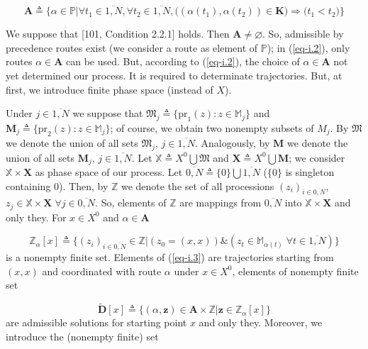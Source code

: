 \documentclass{article}
\begin{document}
\begin{equation*}
  \mathbf A \triangleq
  \big\{
  \alpha \in \mathbb P
  \big|
  \forall t_1 \in \overline{1,N},
  \forall t_2 \in \overline{1,N},
  \big(
    (\alpha(t_1), \alpha(t_2)) \in \mathbf K
  \big)
  \Rightarrow
  \big(t_1 < t_2 \big)
\big\}
\end{equation*}

We suppose that
[101, Condition 2.2.1]  %
holds.
Then
$\mathbf A \neq \varnothing$.
So,
admissible by precedence routes exist
(we consider a route as element of
$\mathbb P$);
in (\ref{eq-i.2}),
only routes
$\alpha \in \mathbf A$
can be used.
But, according to (\ref{eq-i.2}),
the choice of
$\alpha \in \mathbf A$
not yet determined our process.
It is required to determinate trajectories.
But, at first,
we introduce finite phase space
(instead of $X$).

Under
$j \in \overline{1, N}$
we suppose that
$
\mathfrak M_j \triangleq
\{\mathrm{pr}_1(z): z \in \mathbb M_j \}
$
and
$
\mathbf M_j \triangleq
\{ \mathrm{pr}_2(z): z \in \mathbb M_j \}
$;
of course,
we obtain two nonempty subsets of
$M_j$.
By
$\mathfrak M$
we denote the union of all sets
$\mathfrak M_j$,
$j \in \overline{1,N}$.
Analogously,
by
$\mathbf M$
we denote the union of all sets
$\mathbf M_j$,
$j \in \overline{1,N}$.
Let
$\mathbb X \triangleq
X^0 \bigcup \mathfrak M$
and
$
\mathbf X \triangleq
X^0 \bigcup \mathbf M
$;
we consider
$\mathbb X \times \mathbf X$
as phase space of our process.
Let
$\overline{0, N} \triangleq \{0\} \bigcup \overline{1,N}$
($\{0\}$ is singleton containing 0).
Then, by
$\mathbb Z$
we denote the set of all processions
$(z_i)_{i\in\overline{0,N}}$,
$z_j \in \mathbb X \times \mathbf X
\; \forall j \in \overline{0,N}$.
So, elements of
$\mathbb Z$
are mappings from
$\overline{0,N}$
into
$\mathbb X \times \mathbf X$
and only they.
For
$x \in X^0$
and
$\alpha \in \mathbf A$

\begin{equation}
  \label{eq-i.3}
  \mathbb Z_\alpha[x] \triangleq
  \big\{
    (z_i)_{i \in \overline{0,N}} \in \mathbb Z
  \big|
  (z_0 =(x,x))
  \&
  (z_t \in \mathbb M_{\alpha(t)}
  \;\forall t \in \overline{1,N})
  \big\}
\end{equation}
is a nonempty finite set.
Elements of (\ref{eq-i.3})
are trajectories starting from
$(x,x)$
and coordinated with route
$\alpha$
under
$x \in X^0$,
elements of nonempty finite set

\begin{equation}
  \label{eq-i.4}
\tilde {\mathbf D}[x] \triangleq
\big\{
  (\alpha,\mathbf z) \in \mathbf A \times \mathbb Z
\big|
  \mathbf z \in \mathbb Z_\alpha[x]
\big\}
\end{equation}
are admissible solutions for starting point
$x$
and only they.
Moreover,
we introduce the
(nonempty finite)
set
\end{document}
